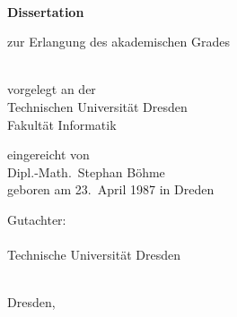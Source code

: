 \pagestyle{empty}

\begin{titlepage}
    \begin{center}
        \textbf{\textsf{\huge \thetitle}}
        \\
        \bigskip\bigskip\bigskip


        \Large
        \textbf{Dissertation}\\
        \bigskip\bigskip

        zur Erlangung des akademischen Grades\\
        \thedegree\\
        \bigskip\bigskip

        vorgelegt an der\\
        Technischen Universität Dresden\\
        Fakultät Informatik\\
        \bigskip\bigskip

        eingereicht von\\
        Dipl.-Math.\ Stephan Böhme\\
        geboren am 23.\ April 1987 in Dreden\\
        \bigskip\bigskip

        \vfill

        Gutachter:\\
        \thesupervisor\\
        Technische Universität Dresden\\[1ex]
        \thesecondsupervisor\\
        \thesecondsupervisoruniversity

        \bigskip\bigskip

        Dresden, \thehandedin
    \end{center}

\end{titlepage}

\cleardoubleemptypage

\pagestyle{scrheadings}




